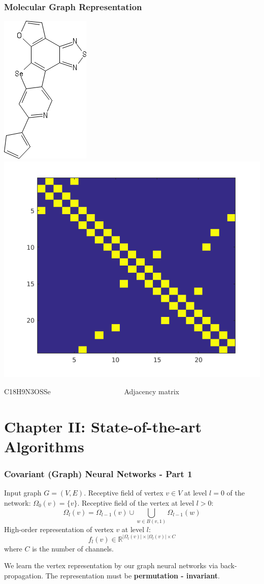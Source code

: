 \documentclass{beamer}
\begin{document}
\begin{frame}
\frametitle{Molecular Graph Representation}
\begin{justify}
\begin{center}
	\includegraphics[scale=0.5]{sketcher}
	\includegraphics[scale=0.5]{adjacency}
\end{center}
C18H9N3OSSe \ \ \ \ \ \ \ \ \ \ \ \ \ \ \ \ \ \ \ \ Adjacency matrix
\end{justify}
\end{frame}

\section{Chapter II: State-of-the-art Algorithms}

\begin{frame}
\frametitle{Covariant (Graph) Neural Networks - Part 1}
Input graph $G = (V, E)$. Receptive field of vertex $v \in V$ at level $l = 0$ of the network: $\Omega_0(v) = \{v\}$. Receptive field of the vertex at level $l > 0$:
$$\Omega_l(v) = \Omega_{l - 1}(v) \cup \bigcup\limits_{w \in B(v, 1)} \Omega_{l - 1}(w)$$
High-order representation of vertex $v$ at level $l$:
$$f_l(v) \in \mathbb{R}^{|\Omega_l(v)| \times |\Omega_l(v)| \times C}$$
where $C$ is the number of channels. 

We learn the vertex representation by our graph neural networks via back-propagation. The representation must be \textbf{permutation - invariant}.
\end{frame}
\end{document}
